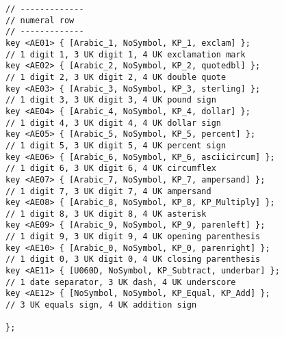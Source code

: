 \begin{verbatim}
// -------------
// numeral row
// -------------
key <AE01> { [Arabic_1, NoSymbol, KP_1, exclam] };
// 1 digit 1, 3 UK digit 1, 4 UK exclamation mark
key <AE02> { [Arabic_2, NoSymbol, KP_2, quotedbl] };
// 1 digit 2, 3 UK digit 2, 4 UK double quote
key <AE03> { [Arabic_3, NoSymbol, KP_3, sterling] }; 
// 1 digit 3, 3 UK digit 3, 4 UK pound sign
key <AE04> { [Arabic_4, NoSymbol, KP_4, dollar] };
// 1 digit 4, 3 UK digit 4, 4 UK dollar sign
key <AE05> { [Arabic_5, NoSymbol, KP_5, percent] }; 
// 1 digit 5, 3 UK digit 5, 4 UK percent sign
key <AE06> { [Arabic_6, NoSymbol, KP_6, asciicircum] };
// 1 digit 6, 3 UK digit 6, 4 UK circumflex 
key <AE07> { [Arabic_7, NoSymbol, KP_7, ampersand] };
// 1 digit 7, 3 UK digit 7, 4 UK ampersand
key <AE08> { [Arabic_8, NoSymbol, KP_8, KP_Multiply] }; 
// 1 digit 8, 3 UK digit 8, 4 UK asterisk
key <AE09> { [Arabic_9, NoSymbol, KP_9, parenleft] };
// 1 digit 9, 3 UK digit 9, 4 UK opening parenthesis
key <AE10> { [Arabic_0, NoSymbol, KP_0, parenright] };
// 1 digit 0, 3 UK digit 0, 4 UK closing parenthesis
key <AE11> { [U060D, NoSymbol, KP_Subtract, underbar] };
// 1 date separator, 3 UK dash, 4 UK underscore
key <AE12> { [NoSymbol, NoSymbol, KP_Equal, KP_Add] };
// 3 UK equals sign, 4 UK addition sign

};

\end{verbatim}
